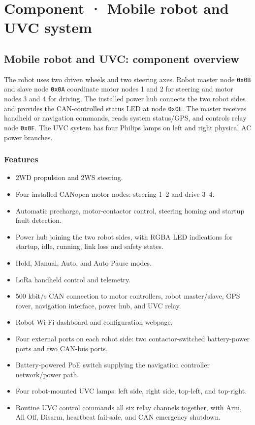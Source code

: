 \documentclass[
  10pt,
  letterpaper,
  openany]{report}
\providecommand{\tightlist}{%
  \setlength{\itemsep}{0pt}\setlength{\parskip}{0pt}}
\begin{document}
\chapter{Component · Mobile robot and UVC
system}\label{component-mobile-robot-and-uvc-system}

\protect{}\label{robot}
\section{Mobile robot and UVC: component
overview}\label{mobile-robot-and-uvc-component-overview}

The robot uses two driven wheels and two steering axes. Robot master
node \texttt{0x0B} and slave node \texttt{0x0A} coordinate motor nodes 1
and 2 for steering and motor nodes 3 and 4 for driving. The installed
power hub connects the two robot sides and provides the CAN-controlled
status LED at node \texttt{0x0E}. The master receives handheld or
navigation commands, reads system status/GPS, and controls relay node
\texttt{0x0F}. The UVC system has four Philips lamps on left and right
physical AC power branches.

\subsection{Features}\label{features-1}

\begin{itemize}
\tightlist
\item
  2WD propulsion and 2WS steering.
\item
  Four installed CANopen motor nodes: steering 1--2 and drive 3--4.
\item
  Automatic precharge, motor-contactor control, steering homing and
  startup fault detection.
\item
  Power hub joining the two robot sides, with RGBA LED indications for
  startup, idle, running, link loss and safety states.
\item
  Hold, Manual, Auto, and Auto Pause modes.
\item
  LoRa handheld control and telemetry.
\item
  500 kbit/s CAN connection to motor controllers, robot master/slave,
  GPS rover, navigation interface, power hub, and UVC relay.
\item
  Robot Wi-Fi dashboard and configuration webpage.
\item
  Four external ports on each robot side: two contactor-switched
  battery-power ports and two CAN-bus ports.
\item
  Battery-powered PoE switch supplying the navigation controller
  network/power path.
\item
  Four robot-mounted UVC lamps: left side, right side, top-left, and
  top-right.
\item
  Routine UVC control commands all six relay channels together, with
  Arm, All Off, Disarm, heartbeat fail-safe, and CAN emergency shutdown.
\end{itemize}
\end{document}
